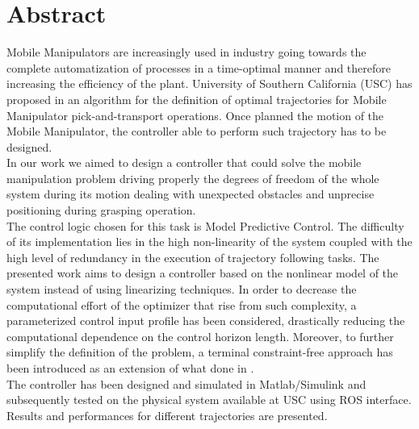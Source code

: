 	\newpage
\chapter*{Abstract}

Mobile Manipulators are increasingly used in industry going towards the complete automatization of processes in a time-optimal manner and therefore increasing the efficiency of the plant. University of Southern California (USC) has proposed in \cite{shantanuthakar} an algorithm for the definition of optimal trajectories for Mobile Manipulator pick-and-transport operations. Once planned the motion of the Mobile Manipulator, the controller able to perform such trajectory has to be designed. \\
In our work we aimed to design a controller that could solve the mobile manipulation problem driving properly the degrees of freedom of the whole system during its motion dealing with unexpected obstacles and unprecise positioning during grasping operation.\\
The control logic chosen for this task is Model Predictive Control. The difficulty of its implementation lies in the high non-linearity of the system coupled with the high level of redundancy in the execution of trajectory following tasks. The presented work aims to design a controller based on the nonlinear model of the system instead of using linearizing techniques. In order to decrease the computational effort of the optimizer that rise from such complexity, a parameterized control input profile has been considered, drastically reducing the computational dependence on the control horizon length. Moreover, to further simplify the definition of the problem, a terminal constraint-free approach has been introduced as an extension of what done in \cite{alamir2018stability}. \\
The controller has been designed and simulated in Matlab/Simulink and subsequently tested on the physical system available at USC using ROS interface. Results and performances for different trajectories are presented.  

\vspace{0.5cm}
\noindent 

